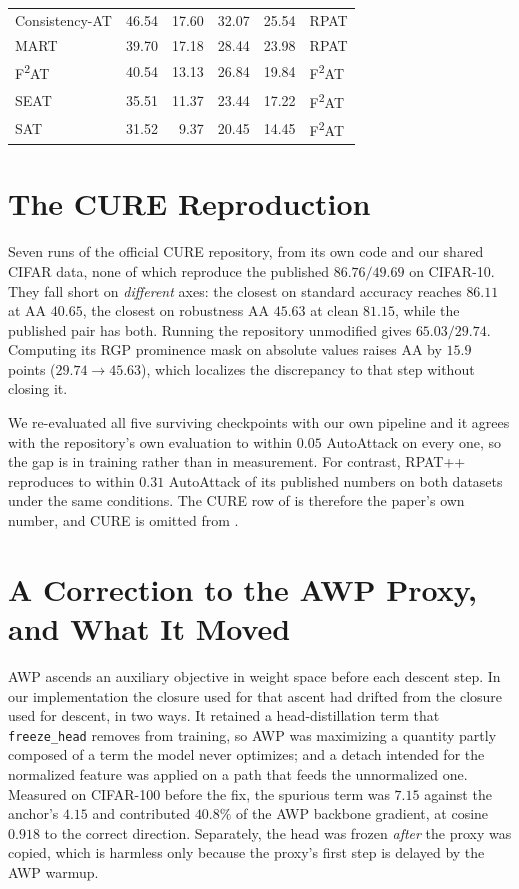 \begin{table}[!htbp]
\begin{tabular}{lrrrrl}
    Consistency-AT             & 46.54 & 17.60 & 32.07 & 25.54 & RPAT \\
    MART                       & 39.70 & 17.18 & 28.44 & 23.98 & RPAT \\
    F\textsuperscript{2}AT     & 40.54 & 13.13 & 26.84 & 19.84 & F\textsuperscript{2}AT \\
    SEAT                       & 35.51 & 11.37 & 23.44 & 17.22 & F\textsuperscript{2}AT \\
    SAT                        & 31.52 &  9.37 & 20.45 & 14.45 & F\textsuperscript{2}AT \\
    \bottomrule
  \end{tabular}
\end{table}

\section{The CURE Reproduction}
\label{app:cure}

Seven runs of the official CURE repository, from its own code and our shared CIFAR data, none of which
reproduce the published $86.76 / 49.69$ on CIFAR-10. They fall short on \emph{different} axes: the
closest on standard accuracy reaches $86.11$ at AA $40.65$, the closest on robustness AA $45.63$ at
clean $81.15$, while the published pair has both. Running the repository unmodified gives
$65.03 / 29.74$. Computing its RGP prominence mask on absolute values raises AA by $15.9$ points
($29.74 \to 45.63$), which localizes the discrepancy to that step without closing it.

We re-evaluated all five surviving checkpoints with our own pipeline and it agrees with the
repository's own evaluation to within $0.05$ AutoAttack on every one, so the gap is in training rather
than in measurement. For contrast, RPAT++ reproduces to within $0.31$ AutoAttack of its published
numbers on both datasets under the same conditions. The CURE row of  is therefore
the paper's own number, and CURE is omitted from .

\section{A Correction to the AWP Proxy, and What It Moved}
\label{app:awp}

AWP ascends an auxiliary objective in weight space before each descent step. In our implementation the
closure used for that ascent had drifted from the closure used for descent, in two ways. It retained a
head-distillation term that \texttt{freeze\_head} removes from training, so AWP was maximizing a
quantity partly composed of a term the model never optimizes; and a detach intended for the normalized
feature was applied on a path that feeds the unnormalized one. Measured on CIFAR-100 before the fix,
the spurious term was $7.15$ against the anchor's $4.15$ and contributed $40.8\%$ of the AWP backbone
gradient, at cosine $0.918$ to the correct direction. Separately, the head was frozen \emph{after} the
proxy was copied, which is harmless only because the proxy's first step is delayed by the AWP warmup.

